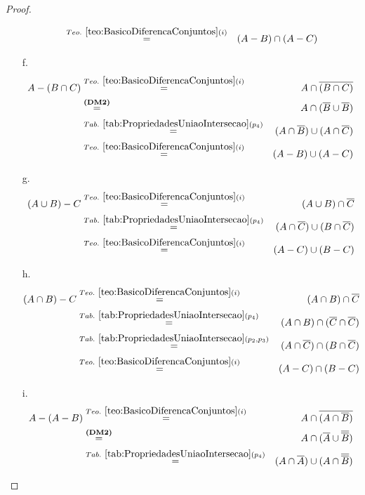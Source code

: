 \begin{proof}
\begin{itemize}
\begin{eqnarray*}
			& \stackrel{Teo. \  \ref{teo:BasicoDiferencaConjuntos}(i)}{=}& (A - B) \cap (A - C)\\
		\end{eqnarray*}
		\item[f.]
		\begin{eqnarray*}
			A - (B \cap C) & \stackrel{Teo. \  \ref{teo:BasicoDiferencaConjuntos}(i)}{=}&  A \cap \overline{(B \cap C)}\\
			& \stackrel{\textbf{(DM2)}}{=}& A \cap (\overline{B} \cup \overline{B})\\
			& \stackrel{Tab. \ \ref{tab:PropriedadesUniaoIntersecao}(p_4)}{=}&  (A \cap \overline{B}) \cup (A \cap \overline{C})\\
			& \stackrel{Teo. \  \ref{teo:BasicoDiferencaConjuntos}(i)}{=}&  (A - B) \cup (A - C)
		\end{eqnarray*}
		\item[g.]
		\begin{eqnarray*}
			(A \cup B) - C & \stackrel{Teo. \  \ref{teo:BasicoDiferencaConjuntos}(i)}{=}& (A \cup B) \cap \overline{C}\\
			& \stackrel{Tab. \ \ref{tab:PropriedadesUniaoIntersecao}(p_4)}{=}& (A \cap \overline{C}) \cup (B \cap \overline{C})\\
			& \stackrel{Teo. \  \ref{teo:BasicoDiferencaConjuntos}(i)}{=} & (A - C) \cup (B - C)
		\end{eqnarray*}
		\item[h.]
		\begin{eqnarray*}
			(A \cap B) - C & \stackrel{Teo. \  \ref{teo:BasicoDiferencaConjuntos}(i)}{=}& (A \cap B) \cap \overline{C}\\
			& \stackrel{Tab. \ \ref{tab:PropriedadesUniaoIntersecao}(p_4)}{=}& (A \cap B) \cap (\overline{C} \cap \overline{C})\\
			& \stackrel{Tab. \ \ref{tab:PropriedadesUniaoIntersecao}(p_2, p_3)}{=}& (A \cap \overline{C}) \cap (B \cap \overline{C})\\
			& \stackrel{Teo. \  \ref{teo:BasicoDiferencaConjuntos}(i)}{=}& (A - C) \cap (B - C)
		\end{eqnarray*}
		\item[i.]
		\begin{eqnarray*}
			A - (A - B) & \stackrel{Teo. \  \ref{teo:BasicoDiferencaConjuntos}(i)}{=} & A \cap \overline{(A \cap \overline{B})}\\
			& \stackrel{\textbf{(DM2)}}{=}& A \cap (\overline{A} \cup \overline{\overline{B}})\\
			& \stackrel{Tab. \ \ref{tab:PropriedadesUniaoIntersecao}(p_4)}{=}& (A \cap \overline{A}) \cup (A \cap \overline{\overline{B}})\\

\end{eqnarray*}
\end{itemize}
\end{proof}
